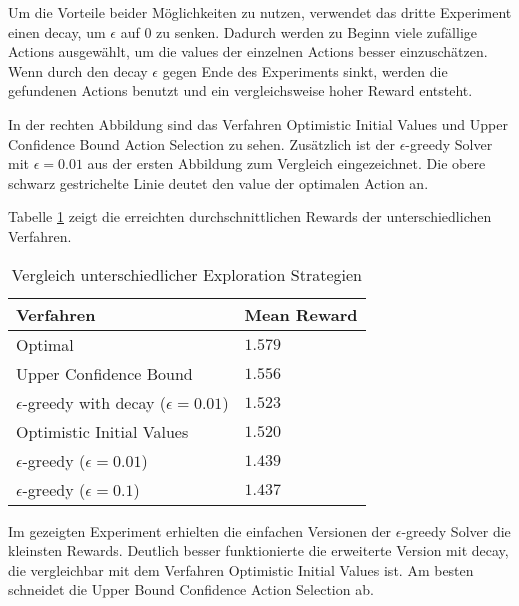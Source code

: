 \documentclass[11pt]{scrartcl}
\begin{document}
Um die Vorteile beider Möglichkeiten zu nutzen, verwendet das dritte Experiment einen
decay, um $\epsilon$ auf $0$ zu senken. Dadurch werden zu Beginn viele zufällige Actions
ausgewählt, um die values der einzelnen Actions besser einzuschätzen. Wenn durch den decay
$\epsilon$ gegen Ende des Experiments sinkt, werden die gefundenen Actions benutzt und ein
vergleichsweise hoher Reward entsteht.

In der rechten Abbildung sind das Verfahren Optimistic Initial Values und Upper Confidence
Bound Action Selection zu sehen. Zusätzlich ist der $\epsilon$-greedy Solver mit
$\epsilon=0.01$ aus der ersten Abbildung zum Vergleich eingezeichnet. Die obere schwarz
gestrichelte Linie deutet den value der optimalen Action an.

Tabelle \ref{tab:explorationstrategies} zeigt die erreichten durchschnittlichen Rewards
der unterschiedlichen Verfahren.

\begin{table}[ht]
  \begin{center}
    \begin{tabular}{l | l}
      \textbf{Verfahren} & \textbf{Mean Reward} \\
      \hline
      Optimal & $1.579$\\
      Upper Confidence Bound & $1.556$ \\
      $\epsilon$-greedy with decay ($\epsilon=0.01$) & $1.523$ \\
      Optimistic Initial Values & $1.520$ \\
      $\epsilon$-greedy ($\epsilon=0.01$) & $1.439$ \\
      $\epsilon$-greedy ($\epsilon=0.1$) & $1.437$ \\
    \end{tabular}

    \caption[ExplorationStrategies]{Vergleich unterschiedlicher Exploration Strategien}
    \label{tab:explorationstrategies}
  \end{center}
\end{table}

\noindent
Im gezeigten Experiment erhielten die einfachen Versionen der $\epsilon$-greedy Solver die
kleinsten Rewards. Deutlich besser funktionierte die erweiterte Version mit decay, die
vergleichbar mit dem Verfahren Optimistic Initial Values ist. Am besten schneidet die
Upper Bound Confidence Action Selection ab.
\end{document}
